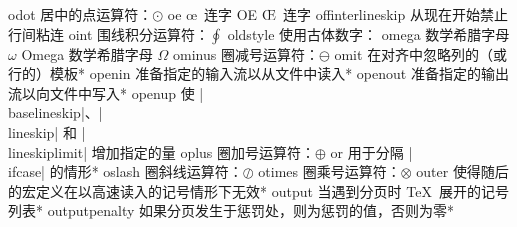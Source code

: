 \capcs odot {居中的点运算符：$\odot$}{}{}
\capcs oe {\oe\ 连字}{}{}
\capcs OE {\OE\ 连字}{}{}
\capcs offinterlineskip {从现在开始禁止行间粘连}{}{}
\capcs oint {围线积分运算符：$\oint$}{}{}
\capcs oldstyle {使用古体数字：{}}{}{}
\capcs omega {数学希腊字母 $\omega$}{}{}
\capcs Omega {数学希腊字母 $\Omega$}{}{}
\capcs ominus {圈减号运算符：$\ominus$}{}{}
\capcs omit {在对齐中忽略列的（或行的）模板}*{}
\capcs openin {准备指定的输入流以从文件中读入}*{}
\capcs openout {准备指定的输出流以向文件中写入}*{}
\capcs openup {使 |\\baselineskip|、|\\lineskip| 和 |\\lineskiplimit| 增加指定的量}{}{}
\capcs oplus {圈加号运算符：$\oplus$}{}{}
\capcs or {用于分隔 |\\ifcase| 的情形}*{\@or}
\capcs oslash {圈斜线运算符：$\oslash$}{}{}
\capcs otimes {圈乘号运算符：$\otimes$}{}{}
\capcs outer {使得随后的宏定义在以高速读入的记号情形下无效}*{}
\capcs output {当遇到分页时 \TeX\ 展开的记号列表}*{}
\capcs outputpenalty {如果分页发生于惩罚处，则为惩罚的值，否则为零}*{}
